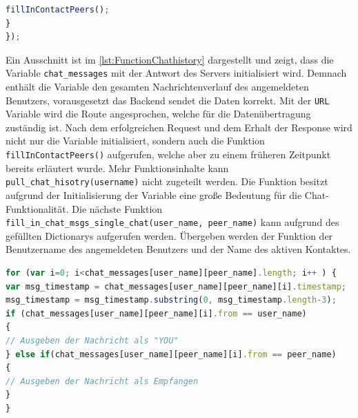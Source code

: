\documentclass[a4paper,titlepage,halfparskip,12pt]{scrreprt}
\begin{document}
\begin{onehalfspacing}
\begin{lstlisting}[language=Javascript,caption=Ausschnitt aus der Funktion \textit{pull\_chat\_hisotry(username)} ,label={lst:FunctionChathistory}]
fillInContactPeers();
}
});
\end{lstlisting}
Ein Ausschnitt ist im \autoref{lst:FunctionChathistory} dargestellt und zeigt, dass die Variable \texttt{chat\_messages} mit der Antwort des Servers initialisiert wird. Demnach enthält die Variable den gesamten Nachrichtenverlauf des angemeldeten Benutzers, vorausgesetzt das Backend sendet die Daten korrekt. Mit der \texttt{URL} Variable wird die Route angesprochen, welche für die Datenübertragung zuständig ist. Nach dem erfolgreichen Request und dem Erhalt der Response wird nicht nur die Variable initialisiert, sondern auch die Funktion \texttt{fillInContactPeers()} aufgerufen, welche aber zu einem früheren Zeitpunkt bereits erläutert wurde. Mehr Funktionsinhalte kann \texttt{pull\_chat\_hisotry(username)} nicht zugeteilt werden. Die Funktion besitzt aufgrund der Initialisierung der Variable eine große Bedeutung für die Chat-Funktionalität. Die nächste Funktion \texttt{fill\_in\_chat\_msgs\_single\_chat(user\_name, peer\_name)} kann aufgrund des gefüllten Dictionarys aufgerufen werden. Übergeben werden der Funktion der Benutzername des angemeldeten Benutzers und der Name des aktiven Kontaktes. 
\begin{lstlisting}[language=Javascript,caption=Ausschnitt aus der Funktion \textit{pull\_chat\_hisotry(username)} ,label={lst:FunctionFillInChat}]
for (var i=0; i<chat_messages[user_name][peer_name].length; i++ ) {
var msg_timestamp = chat_messages[user_name][peer_name][i].timestamp;
msg_timestamp = msg_timestamp.substring(0, msg_timestamp.length-3);
if (chat_messages[user_name][peer_name][i].from == user_name)
{
// Ausgeben der Nachricht als "YOU"	
} else if(chat_messages[user_name][peer_name][i].from == peer_name)
{	
// Ausgeben der Nachricht als Empfangen
}
}
\end{lstlisting}

\end{onehalfspacing}
\end{document}
